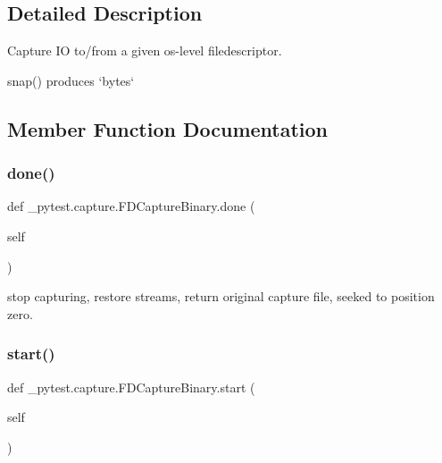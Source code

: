 \subsection{Detailed Description}
\begin{DoxyVerb}Capture IO to/from a given os-level filedescriptor.

snap() produces `bytes`
\end{DoxyVerb}
 

\subsection{Member Function Documentation}
\mbox{\label{class__pytest_1_1capture_1_1_f_d_capture_binary_a2d9e74a114b573728ee03fb7a7c002cd}} 
\subsubsection{\texorpdfstring{done()}{done()}}
{\footnotesize\ttfamily def \+\_\+pytest.\+capture.\+F\+D\+Capture\+Binary.\+done (\begin{DoxyParamCaption}\item[{}]{self }\end{DoxyParamCaption})}

\begin{DoxyVerb}stop capturing, restore streams, return original capture file,
seeked to position zero. \end{DoxyVerb}
 \mbox{\label{class__pytest_1_1capture_1_1_f_d_capture_binary_a57dc7b974c30533a7eedcb579d1d2dcc}} 
\subsubsection{\texorpdfstring{start()}{start()}}
{\footnotesize\ttfamily def \+\_\+pytest.\+capture.\+F\+D\+Capture\+Binary.\+start (\begin{DoxyParamCaption}\item[{}]{self }\end{DoxyParamCaption})}

